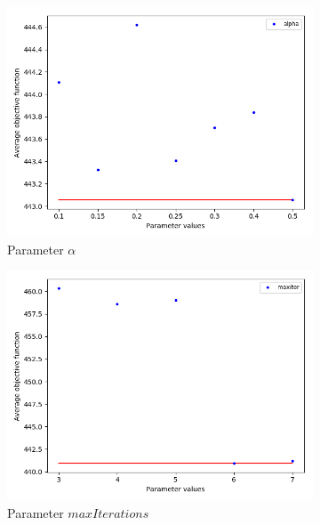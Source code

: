 \begin{figure}[h!]
\begin{subfigure}[b]{.49\linewidth}
\centering
\includegraphics[width=\linewidth]{./img/best-alpha.png}
\caption{ Parameter $\alpha$}\label{fig1a}
\end{subfigure}\hfill
\begin{subfigure}[b]{.49\linewidth}
\centering
\includegraphics[width=\linewidth]{./img/best-maxiter.png}
\caption{Parameter $maxIterations$ }\label{fig1b}
\end{subfigure}\vfill
\begin{subfigure}[b]{.49\linewidth}
\centering

\end{subfigure}
\end{figure}

